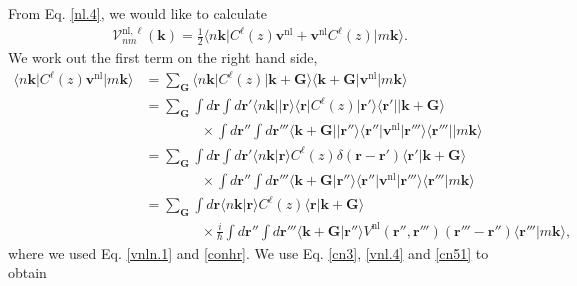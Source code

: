 From Eq. \eqref{nl.4}, we would like to calculate
\begin{align}\label{vnl.5}
\boldsymbol{\mathcal{V}}^{\mathrm{nl},\ell}_{nm}(\mathbf{k})=\frac{1}{2}
\langle n\mathbf{k}\vert  
C^{\ell}(z)\mathbf{v}^\mathrm{nl}+\mathbf{v}^\mathrm{nl} C^{\ell}(z)  
\vert m\mathbf{k}\rangle.
\end{align}  
We work out the first term on the right hand side,
\begin{align}\label{vnl.6}
\langle n\mathbf{k}\vert C^{\ell}(z) 
\mathbf{v}^\mathrm{nl}\vert m\mathbf{k}\rangle
&=\sum_{\mathbf{G}}
\langle n\mathbf{k}\vert C^{\ell}(z)\vert\mathbf{k}+\mathbf{G}\rangle
\langle\mathbf{k}+\mathbf{G}\vert\mathbf{v}^\mathrm{nl}\vert m\mathbf{k}\rangle
\nonumber\\
&=\sum_{\mathbf{G}}
\int d\mathbf{r} 
\int d\mathbf{r}' 
\langle n\mathbf{k}\vert 
\vert\mathbf{r}\rangle\langle\mathbf{r}\vert  
C^{\ell}(z) 
\vert\mathbf{r}'\rangle\langle\mathbf{r}'\vert
\vert\mathbf{k}+\mathbf{G}\rangle \nonumber\\
&\qquad\qquad \times 
\int d\mathbf{r}'' 
\int d\mathbf{r}''' 
\langle\mathbf{k}+\mathbf{G}\vert
\vert\mathbf{r}''\rangle\langle\mathbf{r}''\vert 
\mathbf{v}^\mathrm{nl} 
\vert\mathbf{r}'''\rangle\langle\mathbf{r}'''\vert
\vert m\mathbf{k}\rangle
\nonumber\\
&=\sum_{\mathbf{G}}
\int d\mathbf{r} 
\int d\mathbf{r}' 
\langle n\mathbf{k}\vert\mathbf{r}\rangle
C^{\ell}(z) 
\delta(\mathbf{r}-\mathbf{r}') 
\langle\mathbf{r}'\vert\mathbf{k}+\mathbf{G}\rangle \nonumber\\
&\qquad\qquad \times 
\int d\mathbf{r}'' 
\int d\mathbf{r}''' 
\langle\mathbf{k}+\mathbf{G}\vert\mathbf{r}''\rangle
\langle\mathbf{r}''\vert
\mathbf{v}^\mathrm{nl} 
\vert\mathbf{r}'''\rangle
\langle\mathbf{r}'''\vert m\mathbf{k}\rangle
\nonumber\\
&=\sum_{\mathbf{G}}
\int d\mathbf{r} 
\langle n\mathbf{k}\vert\mathbf{r}\rangle
C^{\ell}(z) 
\langle\mathbf{r}\vert\mathbf{k}+\mathbf{G}\rangle \nonumber\\
&\qquad\qquad \times 
\frac{i}{\hbar}
\int d\mathbf{r}'' 
\int d\mathbf{r}''' 
\langle\mathbf{k}+\mathbf{G}\vert\mathbf{r}''\rangle
V^\mathrm{nl}(\mathbf{r}'',\mathbf{r}''')(\mathbf{r}'''-\mathbf{r}'') 
\langle\mathbf{r}'''\vert m\mathbf{k}\rangle
,
\end{align}
where we used Eq. \eqref{vnln.1} and \eqref{conhr}. 
We use Eq. \eqref{cn3}, \eqref{vnl.4} and \eqref{cn51}  to obtain
